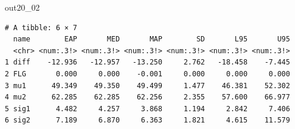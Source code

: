 \begin{MCMCout}{}{out20_02}
	\begin{verbatim}
# A tibble: 6 × 7
  name        EAP       MED       MAP        SD       L95       U95
  <chr> <num:.3!> <num:.3!> <num:.3!> <num:.3!> <num:.3!> <num:.3!>
1 diff    -12.936   -12.957   -13.250     2.762   -18.458    -7.445
2 FLG       0.000     0.000    -0.001     0.000     0.000     0.000
3 mu1      49.349    49.350    49.499     1.477    46.381    52.302
4 mu2      62.285    62.285    62.256     2.355    57.600    66.977
5 sig1      4.482     4.257     3.868     1.194     2.842     7.406
6 sig2      7.189     6.870     6.363     1.821     4.615    11.579
\end{verbatim}
\end{MCMCout}
